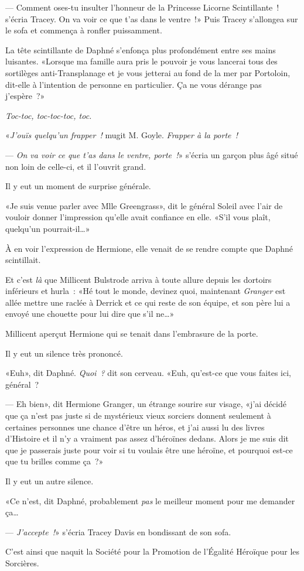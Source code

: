 --- Comment oses-tu insulter l'honneur de la Princesse Licorne Scintillante~! s'écria Tracey. On va voir ce que t'as dans le ventre~!» Puis Tracey s'allongea sur le sofa et commença à ronfler puissamment.

La tête scintillante de Daphné s'enfonça plus profondément entre ses mains luisantes. «Lorsque ma famille aura pris le pouvoir je vous lancerai tous des sortilèges anti-Transplanage et je vous jetterai au fond de la mer par Portoloin, dit-elle à l'intention de personne en particulier. Ça ne vous dérange pas j'espère~?»

\emph{Toc-toc, toc-toc-toc, toc.}

«\emph{J'ouïs quelqu'un frapper~!} mugit M. Goyle. \emph{Frapper à la porte~!}

--- \emph{On va voir ce que t'as dans le ventre, porte~!}» s'écria un garçon plus âgé situé non loin de celle-ci, et il l'ouvrit grand.

Il y eut un moment de surprise générale.

«Je suis venue parler avec Mlle Greengrass», dit le général Soleil avec l'air de vouloir donner l'impression qu'elle avait confiance en elle. «S'il vous plaît, quelqu'un pourrait-il…»

À en voir l'expression de Hermione, elle venait de se rendre compte que Daphné scintillait.

Et c'est \emph{là} que Millicent Bulstrode arriva à toute allure depuis les dortoirs inférieurs et hurla~: «Hé tout le monde, devinez quoi, maintenant \emph{Granger} est allée mettre une raclée à Derrick et ce qui reste de son équipe, et son père lui a envoyé une chouette pour lui dire que s'il ne…»

Millicent aperçut Hermione qui se tenait dans l'embrasure de la porte.

Il y eut un silence très prononcé.

«Euh», dit Daphné. \emph{Quoi~?} dit son cerveau. «Euh, qu'est-ce que vous faites ici, général~?

--- Eh bien», dit Hermione Granger, un étrange sourire sur visage, «j'ai décidé que ça n'est pas juste si de mystérieux vieux sorciers donnent seulement à certaines personnes une chance d'être un héros, et j'ai aussi lu des livres d'Histoire et il n'y a vraiment pas assez d'héroïnes dedans. Alors je me suis dit que je passerais juste pour voir si tu voulais être une héroïne, et pourquoi est-ce que tu brilles comme ça~?»

Il y eut un autre silence.

«Ce n'est, dit Daphné, probablement \emph{pas} le meilleur moment pour me demander ça…

--- \emph{J'accepte~!}» s'écria Tracey Davis en bondissant de son sofa.

\later

C'est ainsi que naquit la Société pour la Promotion de l'Égalité Héroïque pour les Sorcières.
